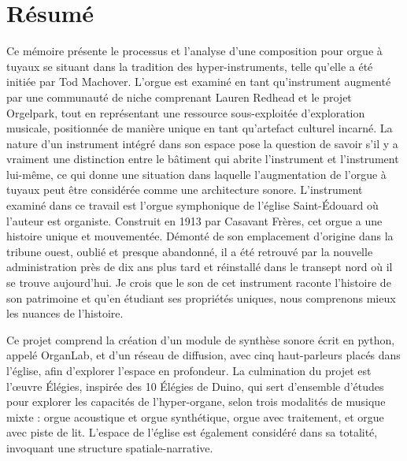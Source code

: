 \documentclass[12pt,twoside,maitrise]{dms_ks}
\theoremstyle{definition}
\begin{document}
\maketitle

\maketitle


\francais

\chapter*{Résumé}

Ce mémoire présente le processus et l'analyse d'une composition pour orgue à tuyaux se situant dans la tradition des hyper-instruments, telle qu'elle a été initiée par Tod Machover. 
L'orgue est examiné en tant qu'instrument augmenté par une communauté de niche comprenant Lauren Redhead et le projet Orgelpark, tout en représentant une ressource sous-exploitée d'exploration musicale, positionnée de manière unique en tant qu'artefact culturel incarné. 
La nature d'un instrument intégré dans son espace pose la question de savoir s'il y a vraiment une distinction entre le bâtiment qui abrite l'instrument et l'instrument lui-même, ce qui donne une situation dans laquelle l'augmentation de l'orgue à tuyaux peut être considérée comme une architecture sonore. 
L'instrument examiné dans ce travail est l'orgue symphonique de l'église Saint-Édouard où l'auteur est organiste. 
Construit en 1913 par Casavant Frères, cet orgue a une histoire unique et mouvementée. 
Démonté de son emplacement d'origine dans la tribune ouest, oublié et presque abandonné, il a été retrouvé par la nouvelle administration près de dix ans plus tard et réinstallé dans le transept nord où il se trouve aujourd'hui. 
Je crois que le son de cet instrument raconte l'histoire de son patrimoine et qu'en étudiant ses propriétés uniques, nous comprenons mieux les nuances de l'histoire. 

Ce projet comprend la création d'un module de synthèse sonore écrit en python, appelé OrganLab, et d'un réseau de diffusion, avec cinq haut-parleurs placés dans l'église, afin d'explorer l'espace en profondeur. 
La culmination du projet est l'œuvre Élégies, inspirée des 10 Élégies de Duino, qui sert d'ensemble d'études pour explorer les capacités de l'hyper-organe, selon trois modalités de musique mixte : orgue acoustique et orgue synthétique, orgue avec traitement, et orgue avec piste de lit. 
L'espace de l'église est également considéré dans sa totalité, invoquant une structure spatiale-narrative. 
\end{document}
